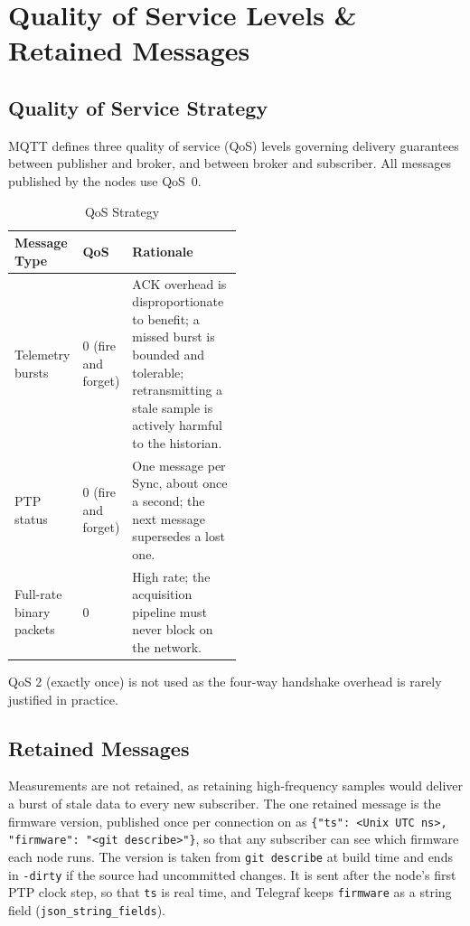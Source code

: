 \section{Quality of Service Levels \& Retained Messages}

\subsection{Quality of Service Strategy}
MQTT defines three quality of service (QoS) levels governing delivery guarantees between publisher and broker, and between broker and subscriber. All messages published by the nodes use QoS~0.

\begin{table}[H]
  \caption{QoS Strategy}
  \centering
  \begin{tabular}{llp{0.5\linewidth}}
    \hline
    \textbf{Message Type} & \textbf{QoS} & \textbf{Rationale} \\
    \hline
    Telemetry bursts & 0 (fire and forget) & ACK overhead is disproportionate to benefit; a missed burst is bounded and tolerable; retransmitting a stale sample is actively harmful to the historian. \\
    PTP status & 0 (fire and forget) & One message per Sync, about once a second; the next message supersedes a lost one. \\
    Full-rate binary packets & 0 & High rate; the acquisition pipeline must never block on the network. \\
    \hline
    \end{tabular}
\end{table}

QoS 2 (exactly once) is not used as the four-way handshake overhead is rarely justified in practice.

\subsection{Retained Messages}
\label{sec:retained}
Measurements are not retained, as retaining high-frequency samples would deliver a burst of stale data to every new subscriber. The one retained message is the firmware version, published once per connection on  as \texttt{\{"ts": <Unix UTC ns>, "firmware": "<git describe>"\}}, so that any subscriber can see which firmware each node runs. The version is taken from \texttt{git describe} at build time and ends in \texttt{-dirty} if the source had uncommitted changes. It is sent after the node's first PTP clock step, so that \texttt{ts} is real time, and Telegraf keeps \texttt{firmware} as a string field (\texttt{json\_string\_fields}).

